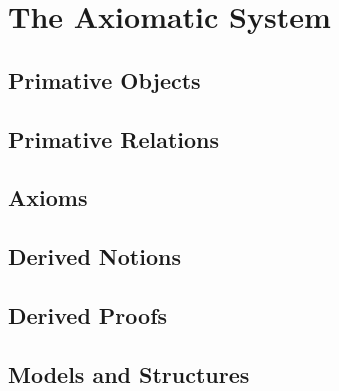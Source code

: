 \documentclass[../../../main/main.tex]{subfiles}
\begin{document}
\chapter{The Axiomatic System}

\section{Primative Objects}

\section{Primative Relations}

\section{Axioms}

\section{Derived Notions}

\section{Derived Proofs}

\section{Models and Structures}
\end{document}
